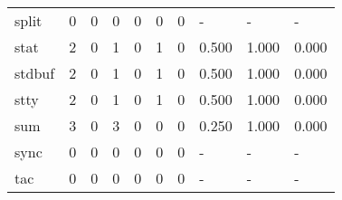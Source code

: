 \begin{longtable}{lp{2.0cm}p{2.0cm}p{2.0cm}p{2.0cm}p{2.0cm}p{2.0cm}p{2.0cm}p{2.0cm}p{2.0cm}}
split     &                      0 &                                  0 &                                 0 &                                0 &                                 0 &                               0 &                                    - &                                      - &                                    - \\
stat      &                      2 &                                  0 &                                 1 &                                0 &                                 1 &                               0 &                                0.500 &                                  1.000 &                                0.000 \\
stdbuf    &                      2 &                                  0 &                                 1 &                                0 &                                 1 &                               0 &                                0.500 &                                  1.000 &                                0.000 \\
stty      &                      2 &                                  0 &                                 1 &                                0 &                                 1 &                               0 &                                0.500 &                                  1.000 &                                0.000 \\
sum       &                      3 &                                  0 &                                 3 &                                0 &                                 0 &                               0 &                                0.250 &                                  1.000 &                                0.000 \\
sync      &                      0 &                                  0 &                                 0 &                                0 &                                 0 &                               0 &                                    - &                                      - &                                    - \\
tac       &                      0 &                                  0 &                                 0 &                                0 &                                 0 &                               0 &                                    - &                                      - &                                    - \\

\end{longtable}
